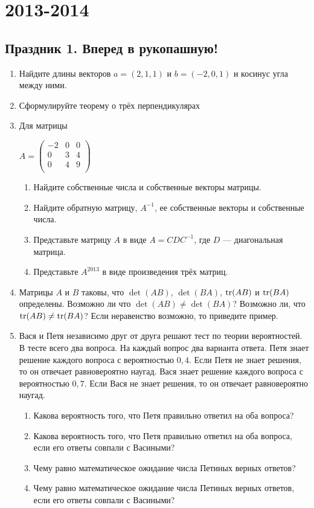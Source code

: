 \documentclass[12pt, a4paper]{article}\usepackage[]{graphicx}\usepackage[]{color}
\begin{document}
\section{2013-2014}

\subsection{Праздник 1. Вперед в рукопашную!}


\begin{enumerate}
\item Найдите длины векторов $a=(2,1,1)$ и $b=(-2,0,1)$ и косинус угла между ними.
\item Сформулируйте теорему о трёх перпендикулярах
\item Для матрицы

$A=\left(%
\begin{array}{ccc}
  -2 & 0 & 0 \\
  0 & 3 & 4 \\
  0 & 4 & 9 \\
\end{array}%
\right)$ \\

\begin{enumerate}
\item Найдите собственные числа и собственные векторы матрицы.
\item Найдите обратную матрицу, $A^{-1}$, ее собственные векторы и собственные числа.
\item Представьте матрицу $A$ в виде $A=CDC^{-1}$, где $D$ — диагональная матрица.
\item Представьте $A^{2013}$ в виде произведения трёх матриц.
\end{enumerate}

\item Матрицы $A$ и $B$ таковы, что $\det(AB)$, $\det(BA)$, $\operatorname{tr}(AB)$ и $\operatorname{tr}(BA)$ определены. Возможно ли что $\det(AB)\neq \det(BA)$? Возможно ли, что $\operatorname{tr}(AB)\neq \operatorname{tr}(BA)$? Если неравенство возможно, то приведите пример.

\item Вася и Петя независимо друг от друга решают тест по теории вероятностей. В тесте всего два вопроса. На каждый вопрос два варианта ответа. Петя знает решение каждого вопроса с вероятностью $0{,}4$. Если Петя не знает решения, то он отвечает равновероятно наугад. Вася знает решение каждого вопроса с вероятностью $0{,}7$. Если Вася не знает решения, то он отвечает равновероятно наугад.
\begin{enumerate}
\item Какова вероятность того, что Петя правильно ответил на оба вопроса?
\item Какова вероятность того, что Петя правильно ответил на оба вопроса, если его ответы совпали с Васиными?
\item Чему равно математическое ожидание числа Петиных верных ответов?
\item Чему равно математическое ожидание числа Петиных верных ответов, если его ответы совпали с Васиными?
\end{enumerate}


\end{enumerate}
\end{document}
